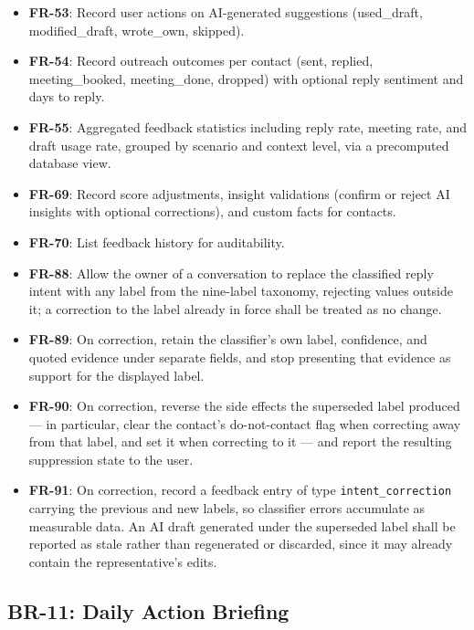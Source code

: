 \documentclass[a4paper]{article}
\begin{document}
\begin{itemize}
    \item \textbf{FR-53}: Record user actions on AI-generated
    suggestions (used\_draft, modified\_draft, wrote\_own, skipped).
    \item \textbf{FR-54}: Record outreach outcomes per contact
    (sent, replied, meeting\_booked, meeting\_done, dropped) with
    optional reply sentiment and days to reply.
    \item \textbf{FR-55}: Aggregated feedback statistics including
    reply rate, meeting rate, and draft usage rate, grouped by
    scenario and context level, via a precomputed database view.
    \item \textbf{FR-69}: Record score adjustments, insight
    validations (confirm or reject AI insights with optional
    corrections), and custom facts for contacts.
    \item \textbf{FR-70}: List feedback history for auditability.
    \item \textbf{FR-88}: Allow the owner of a conversation to replace
    the classified reply intent with any label from the nine-label
    taxonomy, rejecting values outside it; a correction to the label
    already in force shall be treated as no change.
    \item \textbf{FR-89}: On correction, retain the classifier's own
    label, confidence, and quoted evidence under separate fields, and
    stop presenting that evidence as support for the displayed label.
    \item \textbf{FR-90}: On correction, reverse the side effects the
    superseded label produced --- in particular, clear the contact's
    do-not-contact flag when correcting away from that label, and set
    it when correcting to it --- and report the resulting suppression
    state to the user.
    \item \textbf{FR-91}: On correction, record a feedback entry of
    type \texttt{intent\_correction} carrying the previous and new
    labels, so classifier errors accumulate as measurable data. An AI
    draft generated under the superseded label shall be reported as
    stale rather than regenerated or discarded, since it may already
    contain the representative's edits.
\end{itemize}

\subsection{BR-11: Daily Action Briefing}
\end{document}
